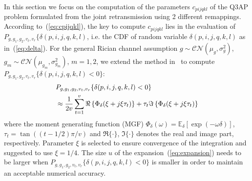 \documentclass[conference]{IEEEtran}
\begin{document}
In this section we focus on the computation of the parameters $c_{pijqkl}$
of the Q3AP problem formulated from the joint retransmission using 2 different
remappings. According to~(\ref{eq:cpijqkl}), the key to compute $c_{pijqkl}$ lies in the evaluation of $P_{g,g_1,g_2,v_t,v_r}\{\delta(p,i,j,q,k,l)$, i.e.
the CDF of random variable $\delta(p,i,j,q,k,l)$ as in~(\ref{eq:delta}). For the
general Rician channel assumption
$g\sim\mathcal{CN}(\mu_{g},\sigma_{g}^2)$,
$g_m\sim\mathcal{CN}(\mu_{g_m},\sigma_{g_m}^2)$, $m=1, 2$, we extend the method
in~\cite{} to compute $P_{g,g_1,g_2,v_t,v_r}\{\delta(p,i,j,q,k,l) < 0\}$:
\begin{align}
    & P_{g,g_1,g_2,v_t,v_r}\{\delta(p,i,j,q,k,l) < 0\} \notag \\
    & \approx \frac{1}{2v}\sum_{t=1}^v \Re\left\{\Phi_{\delta}(\xi +
    j\xi\tau_t)\right\} + \tau_t\Im\left\{\Phi_{\delta}(\xi +
    j\xi\tau_t)\right\}
    \label{eq:expansion}
\end{align}
where the moment generating function (MGF) $\Phi_{\delta}(\omega) =
\mathbb{E}_{\delta}[\exp(-\omega\delta)]$, $\tau_t = \tan((t - 1/2)\pi/v)$
and $\Re\{\cdot\}$, $\Im\{\cdot\}$ denotes the real and image part,
respectively. Parameter $\xi$ is selected to ensure convergence of the
integration and \cite{taricco2002exact} suggested to use $\xi = 1/4$. The size
$u$ of the expansion~(\ref{eq:expansion}) needs to be larger when $
P_{g,g_1,g_2,v_t,v_r}\{\delta(p,i,j,q,k,l) < 0\}$ is smaller in order to
maintain an acceptable numerical accuracy.
\end{document}
